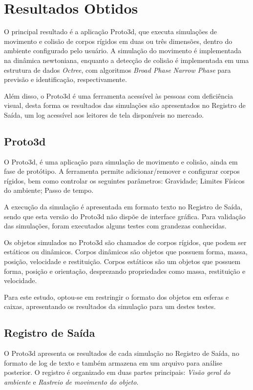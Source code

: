 \documentclass[12pt]{article}
\begin{document}
\section{Resultados Obtidos}
O principal resultado é a aplicação Proto3d, que executa simulações de movimento e colisão de corpos rígidos em duas ou três dimensões, dentro do ambiente configurado pelo usuário. A simulação do movimento é implementada na dinâmica newtoniana, enquanto a detecção de colisão é implementada em uma estrutura de dados \emph{Octree}, com algoritmos \emph{Broad Phase} \emph{Narrow Phase} para previsão e identificação, respectivamente.

Além disso, o Proto3d é uma ferramenta acessível às pessoas com deficiência visual, desta forma os resultados das simulações são apresentados no Registro de Saída, um log acessível aos leitores de tela disponíveis no mercado.

\subsection {Proto3d}
O Proto3d, é uma aplicação para simulação de movimento e colisão, ainda em fase de protótipo. A ferramenta permite adicionar/remover e configurar corpos rígidos, bem como controlar os seguintes parâmetros: Gravidade; Limites Físicos do ambiente; Passo de tempo. 

A execução da simulação é apresentada em formato texto no Registro de Saída, sendo que esta versão do Proto3d não dispõe de interface gráfica. Para validação das simulações, foram executados alguns testes com grandezas conhecidas. 

Os objetos simulados no Proto3d são chamados de corpos rígidos, que podem ser estáticos ou dinâmicos. Corpos dinâmicos são objetos que possuem forma, massa, posição, velocidade e restituição. Corpos estáticos são um objetos que possuem forma, posição e orientação, desprezando propriedades como massa, restituição e velocidade. 

Para este estudo, optou-se em restringir o formato dos objetos em esferas e caixas, apresentando os resultados da simulação para um destes testes.


\subsection{Registro de Saída}
O Proto3d apresenta os resultados de cada simulação no Registro de Saída, no formato de log de texto e também armazena em um arquivo para análise posterior. O registro é organizado em duas partes principais: \emph{Visão geral do ambiente} e \emph{Rastreio de movimento do objeto}.
\end{document}
